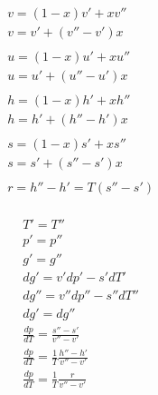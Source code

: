 \documentclass[twocolumn]{article}
\begin{document}
\begin{flushleft}


\end{flushleft}
\normalsize
\begin{multicols}{2}

\begin{align*}
	& v = (1-x)v' + xv{''} \\
	& v = v' + (v''-v')x \\ \\
	& u = (1-x) u' + xu'' \\
	& u = u' + (u''-u')x \\ \\
	& h = (1-x) h' + xh'' \\
	& h = h' + (h''-h')x \\ \\
	& s = (1-x) s' + xs'' \\
	& s = s' + (s''-s')x \\ \\
	& r = h'' - h' = T(s''-s') \\
\end{align*}

\begin{align*}
	& T' = T'' \\
	& p' = p'' \\
	& g' = g'' \\
	&dg' = v'dp' - s'dT' \\
	&dg'' = v'' dp'' - s'' dT'' \\
	&dg' = dg'' \\
	& \frac{dp}{dT} = \frac{s'' - s'}{v'' - v'} \\
	& \frac{dp}{dT} = \frac{1}{T}\frac{h'' - h'}{v'' - v'} \\
	& \frac{dp}{dT} = \frac{1}{T}\frac{r}{v'' -v'} \\
\end{align*}
\end{multicols}
\end{document}
